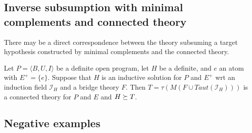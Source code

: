 \subsection{Inverse subsumption with minimal complements and connected theory}
There may be a direct correspondence between the theory subsuming a target hypothesis constructed by minimal complements and the connected theory.

\begin{conjecture}
Let $P=\langle B, U, I \rangle$ be a definite open program, let $H$ be a definite, and $e$ an atom with $E^+=\{e\}$. Suppose that $H$ is an inductive solution for $P$ and $E^+$ wrt an induction field $\mathcal{I}_H$ and a bridge theory $F$.
Then $T=\tau(M(F \cup Taut(\mathcal{I}_H)))$ is a connected theory for $P$ and $E$ and $H \succeq T$.
\end{conjecture}

\subsection{Negative examples}